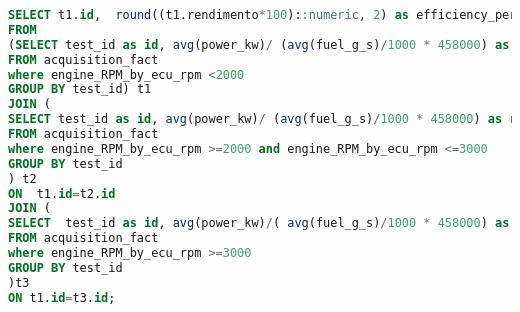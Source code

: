 \begin{lstlisting}[language=SQL]
SELECT t1.id,  round((t1.rendimento*100)::numeric, 2) as efficiency_perc_max2000rpm, round((t2.rendimento*100)::numeric,2) as efficiency_perc_max3000rpm, round((t3.rendimento*100)::numeric,2) as efficiency_perc_over3000rpm
FROM
(SELECT test_id as id, avg(power_kw)/ (avg(fuel_g_s)/1000 * 458000) as rendimento
FROM acquisition_fact
where engine_RPM_by_ecu_rpm <2000
GROUP BY test_id) t1
JOIN (
SELECT test_id as id, avg(power_kw)/ (avg(fuel_g_s)/1000 * 458000) as rendimento
FROM acquisition_fact
where engine_RPM_by_ecu_rpm >=2000 and engine_RPM_by_ecu_rpm <=3000
GROUP BY test_id
) t2
ON  t1.id=t2.id
JOIN (
SELECT  test_id as id, avg(power_kw)/( avg(fuel_g_s)/1000 * 458000) as rendimento
FROM acquisition_fact
where engine_RPM_by_ecu_rpm >=3000
GROUP BY test_id
)t3
ON t1.id=t3.id;
\end{lstlisting}

